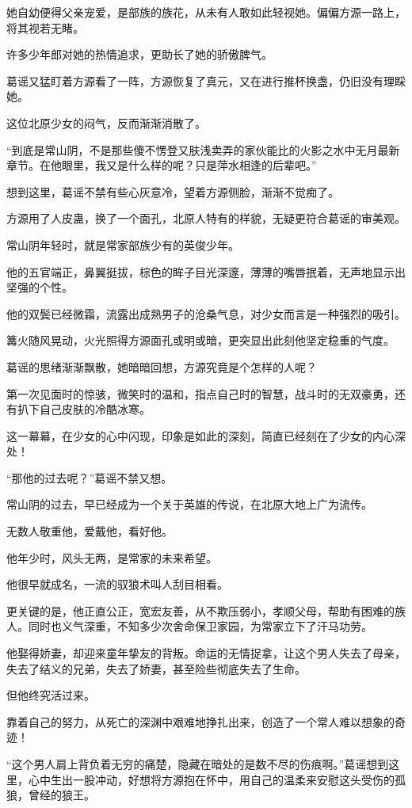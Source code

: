 \begin{this_body}
她自幼便得父亲宠爱，是部族的族花，从未有人敢如此轻视她。偏偏方源一路上，将其视若无睹。

许多少年郎对她的热情追求，更助长了她的骄傲脾气。

葛谣又猛盯着方源看了一阵，方源恢复了真元，又在进行推杯换盏，仍旧没有理睬她。

这位北原少女的闷气，反而渐渐消散了。

“到底是常山阴，不是那些傻不愣登又肤浅卖弄的家伙能比的火影之水中无月最新章节。在他眼里，我又是什么样的呢？只是萍水相逢的后辈吧。”

想到这里，葛谣不禁有些心灰意冷，望着方源侧脸，渐渐不觉痴了。

方源用了人皮蛊，换了一个面孔，北原人特有的样貌，无疑更符合葛谣的审美观。

常山阴年轻时，就是常家部族少有的英俊少年。

他的五官端正，鼻翼挺拔，棕色的眸子目光深邃，薄薄的嘴唇抿着，无声地显示出坚强的个性。

他的双鬓已经微霜，流露出成熟男子的沧桑气息，对少女而言是一种强烈的吸引。

篝火随风晃动，火光照得方源面孔或明或暗，更突显出此刻他坚定稳重的气度。

葛谣的思绪渐渐飘散，她暗暗回想，方源究竟是个怎样的人呢？

第一次见面时的惊骇，微笑时的温和，指点自己时的智慧，战斗时的无双豪勇，还有扒下自己皮肤的冷酷冰寒。

这一幕幕，在少女的心中闪现，印象是如此的深刻，简直已经刻在了少女的内心深处！

“那他的过去呢？”葛谣不禁又想。

常山阴的过去，早已经成为一个关于英雄的传说，在北原大地上广为流传。

无数人敬重他，爱戴他，看好他。

他年少时，风头无两，是常家的未来希望。

他很早就成名，一流的驭狼术叫人刮目相看。

更关键的是，他正直公正，宽宏友善，从不欺压弱小，孝顺父母，帮助有困难的族人。同时也义气深重，不知多少次舍命保卫家园，为常家立下了汗马功劳。

他娶得娇妻，却迎来童年挚友的背叛。命运的无情捉拿，让这个男人失去了母亲，失去了结义的兄弟，失去了娇妻，甚至险些彻底失去了生命。

但他终究活过来。

靠着自己的努力，从死亡的深渊中艰难地挣扎出来，创造了一个常人难以想象的奇迹！

“这个男人肩上背负着无穷的痛楚，隐藏在暗处的是数不尽的伤痕啊。”葛谣想到这里，心中生出一股冲动，好想将方源抱在怀中，用自己的温柔来安慰这头受伤的孤狼，曾经的狼王。


\end{this_body}
